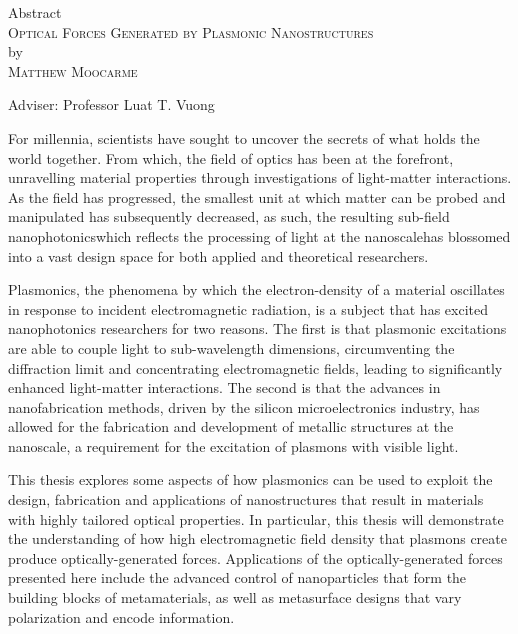 \begin{center}
Abstract \\
\textsc{Optical Forces Generated by Plasmonic Nanostructures} \\
by \\
\textsc{Matthew Moocarme} \\[0.25in]
\end{center}

\vspace{0.25in}
\noindent Adviser: Professor Luat T. Vuong
\vspace{0.25in}
\noindent 

For millennia, scientists have sought to uncover the secrets of what holds the world together. From which, the field of optics has been at the forefront, unravelling material properties through investigations of light-matter interactions. As the field has progressed, the smallest unit at which matter can be probed and manipulated has subsequently decreased, as such, the resulting sub-field nanophotonics\textemdash  which reflects the processing of light at the nanoscale\textemdash has blossomed into a vast design space for both applied and theoretical researchers.

Plasmonics, the phenomena by which the electron-density of a material oscillates in response to incident electromagnetic radiation, is a subject that has excited nanophotonics researchers for two reasons. The first is that plasmonic excitations are able to couple light to sub-wavelength dimensions, circumventing the diffraction limit and concentrating electromagnetic fields, leading to significantly enhanced light-matter interactions. The second is that the advances in nanofabrication methods, driven by the silicon microelectronics industry, has allowed for the fabrication and development of metallic structures at the nanoscale, a requirement for the excitation of plasmons with visible light.

This thesis explores some aspects of how plasmonics can be used to exploit the design, fabrication and applications of nanostructures that result in materials with highly tailored optical properties. In particular, this thesis will demonstrate the understanding of how high electromagnetic field density that plasmons create produce optically-generated forces. Applications of the optically-generated forces presented here include the advanced control of nanoparticles that form the building blocks of metamaterials, as well as metasurface designs that vary polarization and encode information. 

